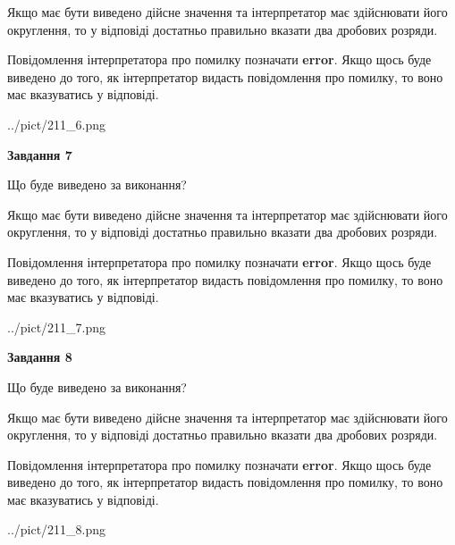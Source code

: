 \documentclass[12pt, ukrainian]{article}
\begin{document}
{\begin {Large}
Якщо має бути виведено дійсне значення та інтерпретатор має здійснювати його округлення, 
то у відповіді достатньо правильно вказати два дробових розряди.

Повідомлення інтерпретатора про помилку позначати \textbf{error}.
Якщо щось буде виведено до того, як інтерпретатор видасть повідомлення про помилку, 
то воно має вказуватись у відповіді. \par

\begin{center}
	{../pict/211_6.png}
\end{center}
\newpage

{\begin {center}\textbf{Завдання 7}\end {center}}\par
Що буде виведено за виконання? \par

Якщо має бути виведено дійсне значення та інтерпретатор має здійснювати його округлення, 
то у відповіді достатньо правильно вказати два дробових розряди.

Повідомлення інтерпретатора про помилку позначати \textbf{error}.
Якщо щось буде виведено до того, як інтерпретатор видасть повідомлення про помилку, 
то воно має вказуватись у відповіді. \par

\begin{center}
	{../pict/211_7.png}
\end{center}
\newpage

{\begin {center}\textbf{Завдання 8}\end {center}}\par
Що буде виведено за виконання? \par

Якщо має бути виведено дійсне значення та інтерпретатор має здійснювати його округлення, 
то у відповіді достатньо правильно вказати два дробових розряди.

Повідомлення інтерпретатора про помилку позначати \textbf{error}.
Якщо щось буде виведено до того, як інтерпретатор видасть повідомлення про помилку, 
то воно має вказуватись у відповіді. \par

\begin{center}
	{../pict/211_8.png}
\end{center}
\newpage


\end{Large}}
\end{document}
